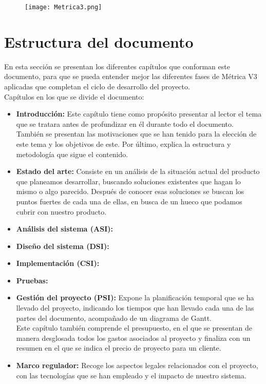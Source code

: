 \begin{figure}[H]
	{\texttt{[image: Metrica3.png]}}
\end{figure}

\section{Estructura del documento}
En esta sección se presentan los diferentes capítulos que conforman este documento, para que se pueda entender mejor las diferentes fases de Métrica V3 aplicadas que completan el ciclo de desarrollo del proyecto. \\ Capítulos en los que se divide el documento:

\begin{itemize}
    \item \textbf{Introducción:} Este capítulo tiene como propósito presentar al lector el tema que se tratara antes de profundizar en él durante todo el documento. También se presentan las motivaciones que se han tenido para la elección de este tema y los objetivos de este. Por último, explica la estructura y metodología que sigue el contenido. 
    \item \textbf{Estado del arte:} Consiste en un análisis de la situación actual del producto que planeamos desarrollar, buscando soluciones existentes que hagan lo mismo o algo parecido. Después de conocer esas soluciones se buscan los puntos fuertes de cada una de ellas, en busca de un hueco que podamos cubrir con nuestro producto.
    \item \textbf{Análisis del sistema (ASI):}
    \item \textbf{Diseño del sistema (DSI):}
    \item \textbf{Implementación (CSI):}
    \item \textbf{Pruebas:}
    \item \textbf{Gestión del proyecto (PSI):} Expone la planificación temporal que se ha llevado del proyecto, indicando los tiempos que han llevado cada una de las partes del documento, acompañado de un diagrama de Gantt. \\ Este capítulo también comprende el presupuesto, en el que se presentan de manera desglosada todos los gastos asociados al proyecto y finaliza con un resumen en el que se indica el precio de proyecto para un cliente.
    \item \textbf{Marco regulador:} Recoge los aspectos legales relacionados con el proyecto, con las tecnologías que se han empleado y el impacto de nuestro sistema.

\end{itemize}
